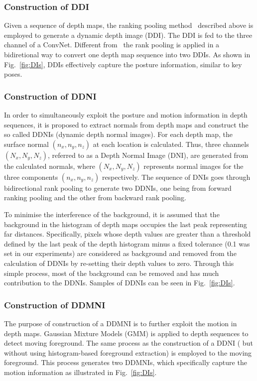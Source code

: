 \documentclass[10pt, a4paper, conference]{IEEEtran}
\begin{document}
\subsubsection{Construction of DDI}
Given a sequence of depth maps, the ranking pooling method~\cite{bilen2016dynamic} described above is employed to generate a dynamic depth image (DDI).  The DDI is fed to the three channel of a ConvNet. Different from~\cite{bilen2016dynamic} the rank pooling is applied in a bidiretional way to convert one depth map sequence into two DDIs. As shown in Fig.~\ref{fig:DIs}, DDIs effectively capture the posture information, similar to key poses.

\subsubsection{Construction of DDNI}

In order to simultaneously exploit the posture and motion information in depth sequences, it is proposed to extract normals from depth maps and construct the so called DDNIs (dynamic depth normal images). For each depth map, the surface normal $(n_x,n_y,n_z)$ at each location is calculated. Thus, three channels $(N_x,N_y,N_z)$, referred to as a Depth Normal Image (DNI), are generated from the calculated normals, where $(N_x,N_y,N_z)$ represents normal images for the three components $(n_x,n_y,n_z)$ respectively. The sequence of DNIs goes through bidirectional rank pooling to generate two DDNIs, one  being from forward ranking pooling and the other from backward rank pooling.

To minimise the interference of the background, it is assumed that the background in the histogram of depth maps occupies the last peak representing far distances. Specifically, pixels whose depth values are greater than a threshold defined by the last peak of the depth histogram minus a fixed tolerance (0.1 was set in our experiments) are considered as background and removed from the calculation of DDNIs by re-setting their depth values to zero. Through this simple process, most of the background can be removed and has much contribution to the DDNIs.  Samples of DDNIs can be seen in Fig.~\ref{fig:DIs}.

\subsubsection{Construction of DDMNI}

The purpose of construction of a DDMNI is to further exploit the motion in depth maps. Gaussian Mixture Models (GMM) is applied to depth sequences to detect moving foreground. The same process as the construction of a DDNI ( but without using histogram-based foreground extraction) is employed to the moving foreground. This process generates two DDMNIs, which specifically capture the motion information as illustrated in Fig.~\ref{fig:DIs}.
\end{document}
